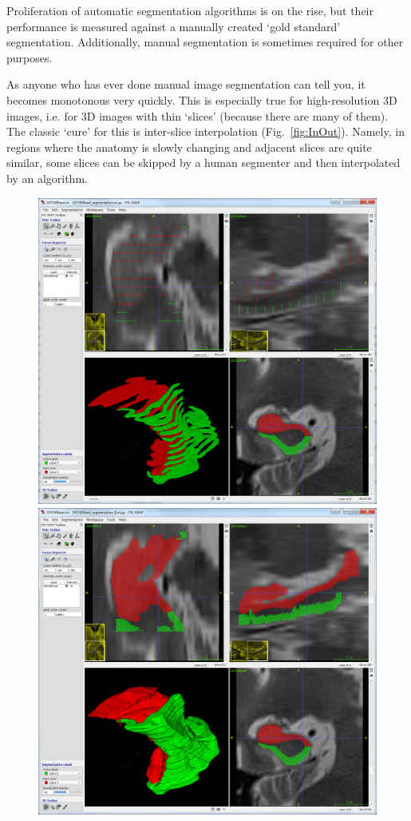 \documentclass{InsightArticle}
\begin{document}
Proliferation of automatic segmentation algorithms is on the rise,
but their performance is measured against a manually created `gold standard' segmentation.
Additionally, manual segmentation is sometimes required for other purposes.

As anyone who has ever done manual image segmentation can tell you,
it becomes monotonous very quickly.
This is especially true for high-resolution 3D images,
i.e. for 3D images with thin `slices' (because there are many of them).
The classic `cure' for this is inter-slice interpolation (Fig.~\ref{fig:InOut}).
Namely, in regions where the anatomy is slowly changing and adjacent slices are quite similar,
some slices can be skipped by a human segmenter and then interpolated by an algorithm.

\begin{figure}[htb]
\center
\includegraphics[scale=0.265]{In1.png}
\includegraphics[scale=0.265]{Out1.png}

\end{figure}
\end{document}
